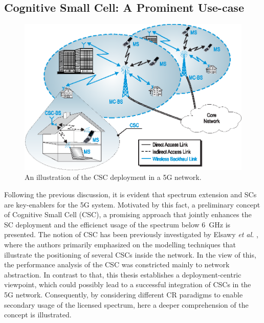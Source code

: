 \subsection{Cognitive Small Cell: A Prominent Use-case}
\begin{figure}[!t]
\centering
\includegraphics[width = \columnwidth]{figures/Cellular_Scenario_CR6F}
\caption{An illustration of the CSC deployment in a 5G network.}
\label{fig:scenario}
\end{figure}



Following the previous discussion, it is evident that spectrum extension and SCs are key-enablers for the 5G system.
Motivated by this fact, a preliminary concept of Cognitive Small Cell (CSC), a promising approach that jointly enhances the SC deployment and the efficienct usage of the spectrum below \SI{6}{GHz} is presented. The notion of CSC has been previously investigated by Elsawy \textit{et al.} \cite{Elsawy13}, where the authors primarily emphasized on the modelling techniques that illustrate the positioning of several CSCs inside the network. In the view of this, the performance analysis of the CSC was constricted mainly to network abstraction. In contrast to that, this thesis establishes a deployment-centric viewpoint, which could possibly lead to a successful integration of CSCs in the 5G network. Consequently, by considering different CR paradigms to enable secondary usage of the licensed spectrum, here a deeper comprehension of the concept is illustrated. %

